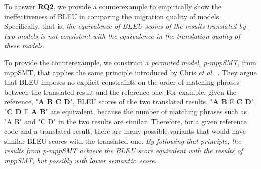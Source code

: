 To answer {\bf RQ2}, we provide a counterexample to empirically show the 
ineffectiveness of BLEU in comparing the migration quality of models. 
%
Specifically, that is, {\em the equivalence of BLEU scores of the results translated 
by two models is not consistent with the equivalence in the translation quality 
of these models}.
%

To provide the counterexample, we construct a {\em permuted model,
  p-mppSMT}, from mppSMT, that applies the same principle introduced
by Chris {\em et al.}~\cite{Callison}. They argue that BLEU imposes
no explicit constraints on the order of matching phrases between the
translated result and the reference one. For example, given the reference, 
"\textbf{A B C D}", BLEU scores of the two translated results, 
"\textbf{A B} E \textbf{C D}", "\textbf{C D} E \textbf{A B}" 
are equivalent, because the number of matching phrases such as "A B" and "C D" 
in the two results are similar. Therefore, for a given reference code and 
a translated result, there are many possible variants that would have 
similar BLEU scores with the translated one. {\em By following that 
principle, the results from p-mppSMT achieve the BLEU score equivalent 
with the results of mppSMT, but possibly with lower semantic~score}.

%

